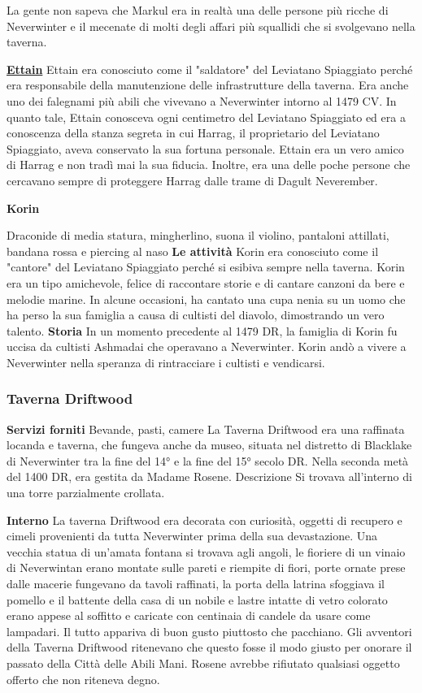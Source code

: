 \documentclass{article}
\begin{document}
La gente non sapeva che Markul era in realtà una delle persone più ricche di Neverwinter e il mecenate di molti degli affari più squallidi che si svolgevano nella taverna.\newline\newline

\hyperlink{et}{\textbf{Ettain}}
Ettain era conosciuto come il "saldatore" del Leviatano Spiaggiato perché era responsabile della manutenzione delle infrastrutture della taverna. Era anche uno dei falegnami più abili che vivevano a Neverwinter intorno al 1479 CV.
In quanto tale, Ettain conosceva ogni centimetro del Leviatano Spiaggiato ed era a conoscenza della stanza segreta in cui Harrag, il proprietario del Leviatano Spiaggiato, aveva conservato la sua fortuna personale. Ettain era un vero amico di Harrag e non tradì mai la sua fiducia. Inoltre, era una delle poche persone che cercavano sempre di proteggere Harrag dalle trame di Dagult Neverember.
\newline

\hypertarget{kor}{\textbf{Korin}}
Draconide di media statura, mingherlino, suona il violino, pantaloni attillati, bandana rossa e piercing al naso
\textbf{Le attività}
Korin era conosciuto come il "cantore" del Leviatano Spiaggiato perché si esibiva sempre nella taverna. Korin era un tipo amichevole, felice di raccontare storie e di cantare canzoni da bere e melodie marine. In alcune occasioni, ha cantato una cupa nenia su un uomo che ha perso la sua famiglia a causa di cultisti del diavolo, dimostrando un vero talento.
\textbf{Storia}
In un momento precedente al 1479 DR, la famiglia di Korin fu uccisa da cultisti Ashmadai che operavano a Neverwinter. Korin andò a vivere a Neverwinter nella speranza di rintracciare i cultisti e vendicarsi.

              \subsubsection{Taverna Driftwood}

\textbf{Servizi forniti}
Bevande, pasti, camere
La Taverna Driftwood era una raffinata locanda e taverna, che fungeva anche da museo, situata nel distretto di Blacklake di Neverwinter tra la fine del 14° e la fine del 15° secolo DR. Nella seconda metà del 1400 DR, era gestita da Madame Rosene.
Descrizione
Si trovava all'interno di una torre parzialmente crollata.


\textbf{Interno}
La taverna Driftwood era decorata con curiosità, oggetti di recupero e cimeli provenienti da tutta Neverwinter prima della sua devastazione. Una vecchia statua di un'amata fontana si trovava agli angoli, le fioriere di un vinaio di Neverwintan erano montate sulle pareti e riempite di fiori, porte ornate prese dalle macerie fungevano da tavoli raffinati, la porta della latrina sfoggiava il pomello e il battente della casa di un nobile e lastre intatte di vetro colorato erano appese al soffitto e caricate con centinaia di candele da usare come lampadari. Il tutto appariva di buon gusto piuttosto che pacchiano. Gli avventori della Taverna Driftwood ritenevano che questo fosse il modo giusto per onorare il passato della Città delle Abili Mani. Rosene avrebbe rifiutato qualsiasi oggetto offerto che non riteneva degno.
\end{document}
